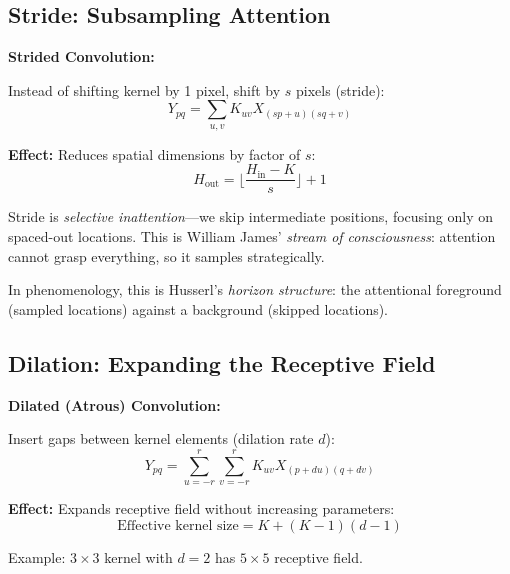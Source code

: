\subsection{Stride: Subsampling Attention}

\begin{seanbox}{3.3}
	\textbf{Strided Convolution:}
	
	Instead of shifting kernel by 1 pixel, shift by $s$ pixels (stride):
	\begin{equation}
		Y_{pq} = \sum_{u,v} K_{uv} X_{(sp+u)(sq+v)}
	\end{equation}
	
	\textbf{Effect:} Reduces spatial dimensions by factor of $s$:
	\begin{equation}
		H_{\text{out}} = \lfloor \frac{H_{\text{in}} - K}{s} \rfloor + 1
	\end{equation}
\end{seanbox}

\begin{philosophical}
	Stride is \textit{selective inattention}---we skip intermediate positions, focusing only on spaced-out locations. This is William James' \textit{stream of consciousness}: attention cannot grasp everything, so it samples strategically.
	
	In phenomenology, this is Husserl's \textit{horizon structure}: the attentional foreground (sampled locations) against a background (skipped locations).
\end{philosophical}

\subsection{Dilation: Expanding the Receptive Field}

\begin{seanbox}{3.4}
	\textbf{Dilated (Atrous) Convolution:}
	
	Insert gaps between kernel elements (dilation rate $d$):
	\begin{equation}
		Y_{pq} = \sum_{u=-r}^r \sum_{v=-r}^r K_{uv} X_{(p+du)(q+dv)}
	\end{equation}
	
	\textbf{Effect:} Expands receptive field without increasing parameters:
	\begin{equation}
		\text{Effective kernel size} = K + (K-1)(d-1)
	\end{equation}
	
	Example: $3 \times 3$ kernel with $d=2$ has $5 \times 5$ receptive field.
\end{seanbox}

